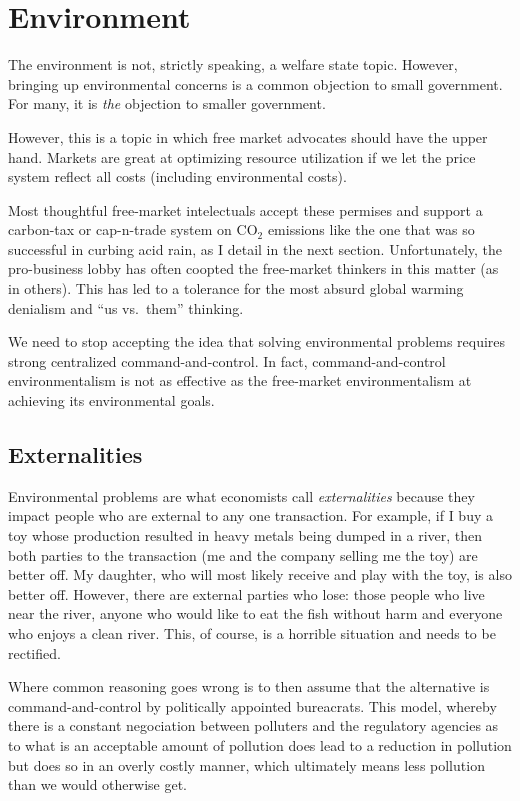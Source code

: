 \chapter{Environment}
\label{chpt:environment}

The environment is not, strictly speaking, a welfare state topic. However,
bringing up environmental concerns is a common objection to small government.
For many, it is \emph{the} objection to smaller government.

However, this is a topic in which free market advocates should have the upper
hand. Markets are great at optimizing resource utilization if we let the price
system reflect all costs (including environmental costs).

Most thoughtful free-market intelectuals accept these permises and support a
carbon-tax or cap-n-trade system on CO$_2$ emissions like the one that was so
successful in curbing acid rain, as I detail in the next section.
Unfortunately, the pro-business lobby has often coopted the free-market
thinkers in this matter (as in others). This has led to a tolerance for the
most absurd global warming denialism and ``us vs.\ them'' thinking.

We need to stop accepting the idea that solving environmental problems requires
strong centralized command-and-control. In fact, command-and-control
environmentalism is not as effective as the free-market environmentalism at
achieving its environmental goals.

\section{Externalities}

Environmental problems are what economists call \emph{externalities} because
they impact people who are external to any one transaction. For example, if I
buy a toy whose production resulted in heavy metals being dumped in a river,
then both parties to the transaction (me and the company selling me the toy)
are better off. My daughter, who will most likely receive and play with the
toy, is also better off. However, there are external parties who lose: those
people who live near the river, anyone who would like to eat the fish without
harm and everyone who enjoys a clean river. This, of course, is a horrible
situation and needs to be rectified.

Where common reasoning goes wrong is to then assume that the alternative is
command-and-control by politically appointed bureacrats. This model, whereby
there is a constant negociation between polluters and the regulatory agencies
as to what is an acceptable amount of pollution does lead to a reduction in
pollution but does so in an overly costly manner, which ultimately means less
pollution than we would otherwise get.

